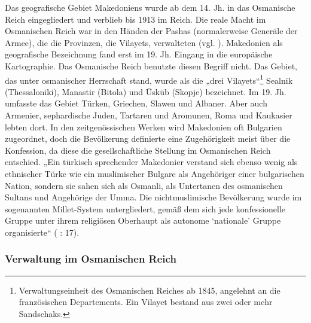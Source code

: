 Das geografische Gebiet Makedoniens wurde ab dem 14. Jh. in das Osmanische Reich eingegliedert und verblieb bis 1913 im Reich. Die reale Macht im Osmanischen Reich war in den Händen der Pashas (normalerweise Generäle der Armee), die die Provinzen, die Vilayets, verwalteten (vgl. \cite{toepfer}). Makedonien als geografische Bezeichnung fand erst im 19. Jh. Eingang in die europäische Kartographie. Das Osmanische Reich benutzte diesen Begriff nicht. Das Gebiet, das unter osmanischer Herrschaft stand, wurde als die „drei Vilayets“\footnote{Verwaltungseinheit des Osmanischen Reiches ab 1845, angelehnt an die französischen Departements. Ein Vilayet bestand aus zwei oder mehr Sandschaks.} Sealnik (Thessaloniki), Manastir (Bitola) und Üsküb (Skopje) bezeichnet. Im 19. Jh. umfasste das Gebiet Türken, Griechen, Slawen und Albaner. Aber auch Armenier, sephardische Juden, Tartaren und Aromunen, Roma und Kaukasier lebten dort. In den zeitgenössischen Werken wird Makedonien oft Bulgarien zugeordnet, doch die Bevölkerung definierte eine Zugehörigkeit meist über die Konfession, da diese die gesellschaftliche Stellung im Osmanischen Reich entschied. „Ein türkisch sprechender Makedonier verstand sich ebenso wenig als ethnischer Türke wie ein muslimischer Bulgare als Angehöriger einer bulgarischen Nation, sondern sie sahen sich als Osmanli, als Untertanen des osmanischen Sultans und Angehörige der Umma. Die nichtmuslimische Bevölkerung wurde im sogenannten Millet-System untergliedert, gemäß dem sich jede konfessionelle Gruppe unter ihrem religiösen Oberhaupt als autonome ‘nationale’ Gruppe organisierte“ (\cite{opfer} : 17).

\subsubsection{Verwaltung im Osmanischen Reich}


